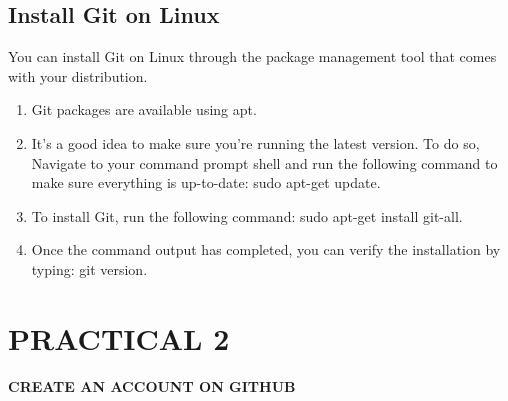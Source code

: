 \documentclass[12pt]{article}
\begin{document}
\subsection{Install Git on Linux}
You can install Git on Linux through the package management tool that comes with your distribution.

\begin{enumerate}
\item Git packages are available using apt.
\item It's a good idea to make sure you're running the latest version. To do so, Navigate to your command prompt shell and run the following command to make sure everything is up-to-date: sudo apt-get update.

\item To install Git, run the following command: sudo apt-get install git-all.

\item Once the command output has completed, you can verify the installation by typing: git version.

\end{enumerate}
\clearpage


\section{PRACTICAL 2}
{\bfseries \uppercase{Create an account on github}}
\end{document}
